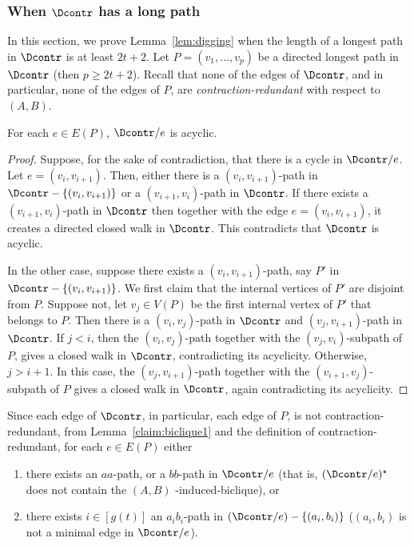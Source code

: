 \subsubsection{When $\Dcontr$ has a long path}\label{sec:biclique:longpath}

In this section, we prove Lemma~\ref{lem:digging} when the length of a longest path in $\Dcontr$ is at least $2t+2$.
Let $P=(v_1, \ldots,v_p)$
be a directed longest path in $\Dcontr$ (then $p \geq 2t+2$).
Recall that none of the edges of $\Dcontr$, and in particular, none  of the edges of $P$, are {\em contraction-redundant} with respect to $(A,B)$.

\begin{lemma}\label{claim:biclique1}
For each $e \in E(P)$, $\Dcontr/e$ is acyclic.
\end{lemma}

\begin{proof}
Suppose, for the sake of contradiction, that there is a cycle in $\Dcontr/e$. Let $e=(v_i,v_{i+1})$. 
Then, either there is a $(v_i,v_{i+1})$-path in $\Dcontr - \{(v_i,v_{i+1})\}$ or a $(v_{i+1},v_i)$-path in $\Dcontr$. 
If there exists a $(v_{i+1},v_i)$-path in $\Dcontr$ then together with the edge $e=(v_i,v_{i+1})$, it creates a directed closed walk in $\Dcontr$. 
This contradicts that $\Dcontr$ is acyclic. 

In the other case, suppose there exists a $(v_i,v_{i+1})$-path, say $P'$ in $\Dcontr -\{(v_i,v_{i+1})\}$. We first claim that the internal vertices of $P'$ are disjoint from $P$. Suppose not, let $v_j \in V(P)$ be the first internal vertex of $P'$ that belongs to $P$. Then there is a $(v_i,v_j)$-path in $\Dcontr$ and $(v_j,v_{i+1})$-path in $\Dcontr$. If $j<i$, then the $(v_i,v_j)$-path together with the $(v_j,v_i)$-subpath of $P$, gives a closed walk in $\Dcontr$, contradicting its acyclicity. Otherwise, $j>i+1$. In this case, the $(v_j,v_{i+1})$-path together with the $(v_{i+1},v_j)$-subpath of $P$ gives a closed walk in $\Dcontr$, again contradicting its acyclicity.
\end{proof}

Since each edge of $\Dcontr$, in particular, each edge of $P$, is not contraction-redundant, from Lemma~\ref{claim:biclique1} and the definition of contraction-redundant, for each $e \in E(P)$ either
\begin{enumerate}
\item there exists an $aa$-path, or a $bb$-path in $\Dcontr/e$ (that is, $(\Dcontr/e)^{\star}$ does not contain the $(A,B)$ -induced-biclique), or 
\item there exists $i \in [g(t)]$ an $a_{i}b_{i}$-path in $(\Dcontr/e )- \{(a_{i},b_{i})\}$ ($(a_{i},b_{i})$ is not a minimal edge in $\Dcontr/e$).
\end{enumerate}

